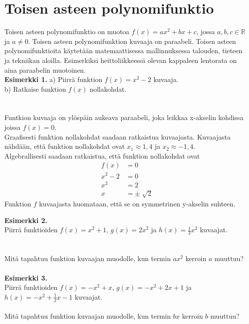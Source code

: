 \chapter{Toisen asteen polynomifunktio}
Toisen asteen polynomifunktio on muotoa $f(x)=ax^2+bx+c$, jossa $a,b,c \in \mathbb{R}$ ja $a \neq 0$. Toisen asteen polynomifunktion kuvaaja on paraabeli. Toisen asteen polynomifunktioita käytetään matemaattisessa mallinnuksessa talouden, tieteen ja tekniikan aloilla. Esimerkiksi heittoliikkeessä olevan kappaleen lentorata on aina paraabelin muotoinen. \\
\textbf{Esimerkki 1.}
a) Piirrä funktion $f(x)=x^2-2$ kuvaaja. \\
b) Ratkaise funktion $f(x)$ nollakohdat. \\ \\
\missingfigure \\
Funtkion kuvaaja on ylöspäin aukeava paraabeli, joka leikkaa x-akselin kohdissa joissa $f(x)=0$. \\
Graafisesti funktion nollakohdat saadaan ratkaistua kuvaajasta. Kuvaajasta nähdään, että funktion nollakohdat ovat $x_1 \approx 1,4$ ja $x_2 \approx -1,4$. \\
Algebrallisesti saadaan ratkaistua, että funktion nollakohdat ovat
\begin{align*}
f(x)&=0 \\
x^2-2&=0 \\
x^2&=2 \\
x&= \pm \sqrt[]{2}
\end{align*}
Funktion $f$ kuvaajasta huomataan, että se on symmetrinen y-akselin suhteen.

\textbf{Esimerkki 2.} \\
Piirrä funktioiden $f(x)=x^2+1$, $g(x)=2x^2$ ja $h(x)=\frac{1}{3}x^2$ kuvaajat. \\ \\
\missingfigure \\
Mitä tapahtuu funktion kuvaajan muodolle, kun termin $ax^2$ kerroin $a$ muuttuu? \\ \\

\textbf{Esimerkki 3.} \\
Piirrä funktioiden $f(x)=-x^2+x$, $g(x)=-x^2+2x+1$ ja $h(x)=-x^2+\frac{1}{2}x-1$ kuvaajat. \\
\missingfigure \\
Mitä tapahtuu funktion kuvaajan muodolle, kun termin $bx$ kerroin $b$ muuttuu? \\ \\

